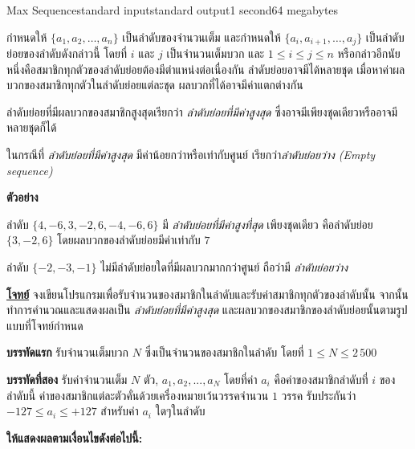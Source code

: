 \documentclass[11pt,a4paper]{article}
\begin{document}
\begin{problem}{Max Sequence}{standard input}{standard output}{1 second}{64 megabytes}

กำหนดให้ $\{a_1 , a_2 , … , a_n\}$ เป็นลำดับของจำนวนเต็ม และกำหนดให้ $\{a_i , a_{i+1} , … , a_j\}$ เป็นลำดับย่อยของลำดับดังกล่าวนี้ โดยที่ $i$ และ $j$ เป็นจำนวนเต็มบวก และ $1 \leq i \leq j \leq n$ หรือกล่าวอีกนัยหนึ่งคือสมาชิกทุกตัวของลำดับย่อยต้องมีตำแหน่งต่อเนื่องกัน ลำดับย่อยอาจมีได้หลายชุด เมื่อหาค่าผลบวกของสมาชิกทุกตัวในลำดับย่อยแต่ละชุด ผลบวกที่ได้อาจมีค่าแตกต่างกัน

ลำดับย่อยที่มีผลบวกของสมาชิกสูงสุดเรียกว่า \textit{ลำดับย่อยที่มีค่าสูงสุด} ซึ่งอาจมีเพียงชุดเดียวหรืออาจมีหลายชุดก็ได้

ในกรณีที่ \textit{ลำดับย่อยที่มีค่าสูงสุด} มีค่าน้อยกว่าหรือเท่ากับศูนย์ เรียกว่า\textit{ลำดับย่อยว่าง (Empty sequence)}

\bigskip

\textbf{ตัวอย่าง}

ลำดับ $\{4, -6, 3, -2, 6, -4, -6, 6\}$ มี \textit{ลำดับย่อยที่มีค่าสูงที่สุด} เพียงชุดเดียว คือลำดับย่อย $\{3, -2, 6\}$ โดยผลบวกของลำดับย่อยมีค่าเท่ากับ $7$

ลำดับ $\{-2, -3, -1\}$ ไม่มีลำดับย่อยใดที่มีผลบวกมากกว่าศูนย์ ถือว่ามี \textit{ลำดับย่อยว่าง}


\underline{\textbf{โจทย์}} จงเขียนโปรแกรมเพื่อรับจำนวนของสมาชิกในลำดับและรับค่าสมาชิกทุกตัวของลำดับนั้น จากนั้นทำการคำนวณและแสดงผลเป็น \textit{ลำดับย่อยที่มีค่าสูงสุด} และผลบวกของสมาชิกของลำดับย่อยนั้นตามรูปแบบที่โจทย์กำหนด


\InputFile
\textbf{บรรทัดแรก} รับจำนวนเต็มบวก $N$ ซึ่งเป็นจำนวนของสมาชิกในลำดับ โดยที่ $1 \leq N \leq 2\,500$ 

\textbf{บรรทัดที่สอง} รับค่าจำนวนเต็ม $N$ ตัว, $a_1,a_2,...,a_N$ โดยที่ค่า $a_i$ คือค่าของสมาชิกลำดับที่ $i$ ของลำดับนี้ ค่าของสมาชิกแต่ละตัวคั่นด้วยเครื่องหมายเว้นวรรคจำนวน $1$ วรรค รับประกันว่า $-127 \leq a_i \leq +127$ สำหรับค่า $a_i$ ใดๆในลำดับ


\OutputFile

\textbf{ให้แสดงผลตามเงื่อนไขดังต่อไปนี้:}
\begin{enumerate}


\end{enumerate}
\end{problem}
\end{document}
